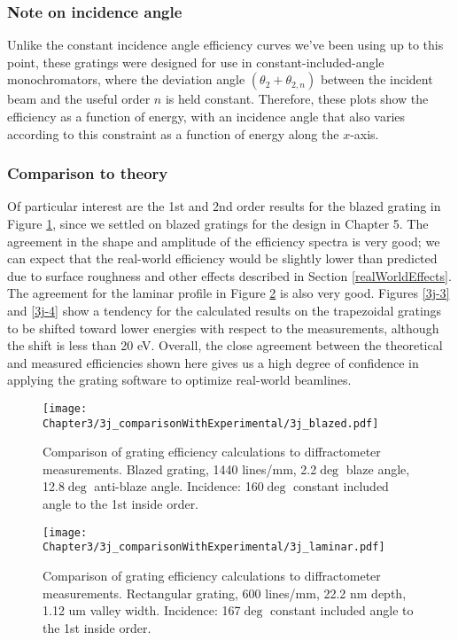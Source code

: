 \subsubsection{Note on incidence angle}
Unlike the constant incidence angle efficiency curves we've been using up to this point, these gratings were designed for use in constant-included-angle monochromators, where the deviation angle $(\theta_2 + \theta_{2,n})$ between the incident beam and the useful order $n$ is held constant.  Therefore, these plots show the efficiency as a function of energy, with an incidence angle that also varies according to this constraint as a function of energy along the $x$-axis.

\subsubsection{Comparison to theory}
Of particular interest are the 1st and 2nd order results for the blazed grating in Figure \ref{3j-1}, since we settled on blazed gratings for the design in Chapter 5.  The agreement in the shape and amplitude of the efficiency spectra is very good; we can expect that the real-world efficiency would be slightly lower than predicted due to surface roughness and other effects described in Section \ref{realWorldEffects}.  The agreement for the laminar profile in Figure \ref{3j-2} is also very good.  Figures \ref{3j-3} and \ref{3j-4} show a tendency for the calculated results on the trapezoidal gratings to be shifted toward lower energies with respect to the measurements, although the shift is less than 20 eV.  Overall, the close agreement between the theoretical and measured efficiencies shown here gives us a high degree of confidence in applying the grating software to optimize real-world beamlines.
 
\begin{figure}[htbp] %
   \centering
   \texttt{[image: Chapter3/3j\_comparisonWithExperimental/3j\_blazed.pdf]} 
   \caption{Comparison of grating efficiency calculations to diffractometer measurements.  Blazed grating, 1440 lines/mm, 2.2$\deg$ blaze angle, 12.8$\deg$ anti-blaze angle. Incidence: 160$\deg$ constant included angle to the 1st inside order.}
   \label{3j-1}
\end{figure}

\begin{figure}[htbp] %
   \centering
   \texttt{[image: Chapter3/3j\_comparisonWithExperimental/3j\_laminar.pdf]} 
   \caption{Comparison of grating efficiency calculations to diffractometer measurements.  Rectangular grating, 600 lines/mm, 22.2 nm depth, 1.12 um valley width.  Incidence: 167$\deg$ constant included angle to the 1st inside order.}
   \label{3j-2}
\end{figure}

